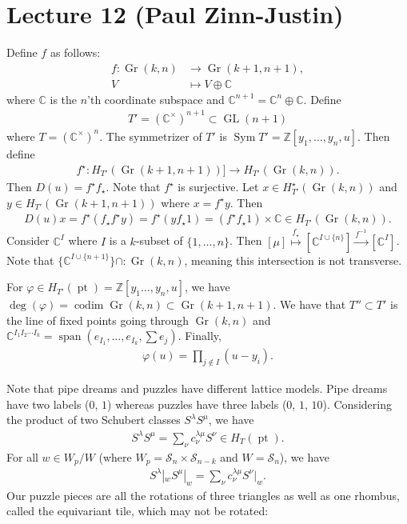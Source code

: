 \documentclass[12pt]{amsart}
\numberwithin{equation}{section}
\theoremstyle{definition}
\numberwithin{figure}{section}
\newcommand{\C}{\mathbb{C}}
\newcommand{\Z}{\mathbb{Z}}
\newcommand{\cS}{\mathcal{S}}
\newcommand{\GL}{\operatorname{GL}}
\newcommand{\Sym}{\operatorname{Sym}}
\newcommand{\pt}{\operatorname{pt}}
\newcommand{\codim}{\operatorname{codim}}
\newcommand{\spn}{\operatorname{span}}
\newcommand{\on}[1]{\operatorname{#1}}
\newcommand{\Gr}{\on{Gr}}
\begin{document}
\section{Lecture 12 (Paul Zinn-Justin)}
    Define $f$ as follows:
\begin{align*}
    f:\Gr(k,n)&\to\Gr(k+1,n+1), \\
    V&\mapsto V\oplus\C
\end{align*}
where $\C$ is the $n$'th coordinate subspace and $\C^{n+1}=\C^n\oplus\C$.
Define
\begin{align*}
    T'=(\C^\times)^{n+1}\subset\GL(n+1)
\end{align*}
where $T=(\C^\times)^n$. The symmetrizer of $T'$ is $\Sym T'=\Z[y_1,\ldots,y_n,u]$. Then define
\begin{align*}
    f^\star:H_{T'}(\Gr(k+1,n+1))]\to H_{T'}(\Gr(k,n)).
\end{align*}
Then $D(u)=f^\star f_\star$. Note that $f^\star$ is surjective. Let $x\in H_{T'}^\star(\Gr(k,n))$ and $y\in H_{T'}(\Gr(k+1,n+1))$ where $x=f^\star y$. Then
\begin{align*}
    D(u)x = f^\star(f_\star f^\star y) = f^\star(yf_\star 1) = (f^\star f_\star 1)\times\C\in H_{T'}(\Gr(k,n)).
\end{align*}
Consider $\C^I$ where $I$ is a $k$-subset of $\{1,\ldots,n\}$. Then $[\mu]\stackrel{f_\star}{\mapsto}[\C^{I\cup\{n\}}]\stackrel{f^{-1}}{\to}[\C^I]$. Note that $\{\C^{I\cup\{n+1\}}\}\cap:\Gr(k,n)$, meaning this intersection is not transverse.

For $\varphi\in H_{T'}(\pt)=\Z[y_1\ldots,y_n,u]$, we have $\deg(\varphi)=\codim\Gr(k,n)\subset\Gr(k+1,n+1)$. We have that $T''\subset T'$ is the line of fixed points going through $\Gr(k,n)$ and $\C^{I_1I_2\cdots I_k}=\spn(e_{I_1},\ldots,e_{I_k},\sum e_j)$. Finally,
\begin{align*}
    \varphi(u) = \prod_{j\notin I}(u-y_i).
\end{align*}

Note that pipe dreams and puzzles have different lattice models. Pipe dreams have two labels ($0$, $1$) whereas puzzles have three labels ($0$, $1$, $10$). Considering the product of two Schubert classes $S^\lambda S^\mu$, we have
\begin{align*}
    S^\lambda S^\mu = \sum_\nu c_\nu^{\lambda\mu} S^\nu\in H_T(\pt).
\end{align*}
For all $w\in W_p/W$ (where $W_p=\cS_n\times\cS_{n-k}$ and $W=\cS_n$), we have
\begin{align*}
    S^\lambda|_wS^\mu|_w = \sum_\nu c_\nu^{\lambda\mu}S^\nu|_w.
\end{align*}
Our puzzle pieces are all the rotations of three triangles as well as one rhombus, called the equivariant tile, which may not be rotated: 
\end{document}
